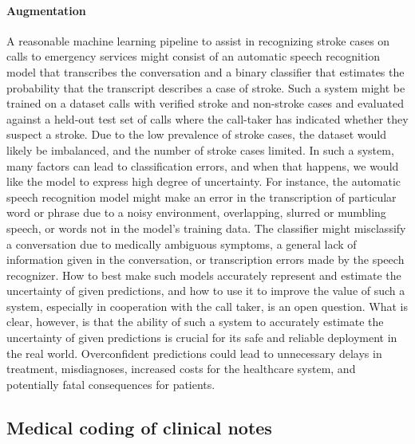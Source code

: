 \paragraph{Augmentation} A reasonable machine learning pipeline to assist in recognizing stroke cases on calls to emergency services might consist of an automatic speech recognition model that transcribes the conversation and a binary classifier that estimates the probability that the transcript describes a case of stroke. 
Such a system might be trained on a dataset calls with verified stroke and non-stroke cases and evaluated against a held-out test set of calls where the call-taker has indicated whether they suspect a stroke. Due to the low prevalence of stroke cases, the dataset would likely be imbalanced, and the number of stroke cases limited. 
In such a system, many factors can lead to classification errors, and when that happens, we would like the model to express high degree of uncertainty. 
For instance, the automatic speech recognition model might make an error in the transcription of particular word or phrase due to a noisy environment, overlapping, slurred or mumbling speech, or words not in the model's training data. 
The classifier might misclassify a conversation due to medically ambiguous symptoms, a general lack of information given in the conversation, or transcription errors made by the speech recognizer. 
How to best make such models accurately represent and estimate the uncertainty of given predictions, and how to use it to improve the value of such a system, especially in cooperation with the call taker, is an open question.
What is clear, however, is that the ability of such a system to accurately estimate the uncertainty of given predictions is crucial for its safe and reliable deployment in the real world. Overconfident predictions could lead to unnecessary delays in treatment, misdiagnoses, increased costs for the healthcare system, and potentially fatal consequences for patients.


\subsection{Medical coding of clinical notes} \label{subsec:motivation-medical-coding}
%
